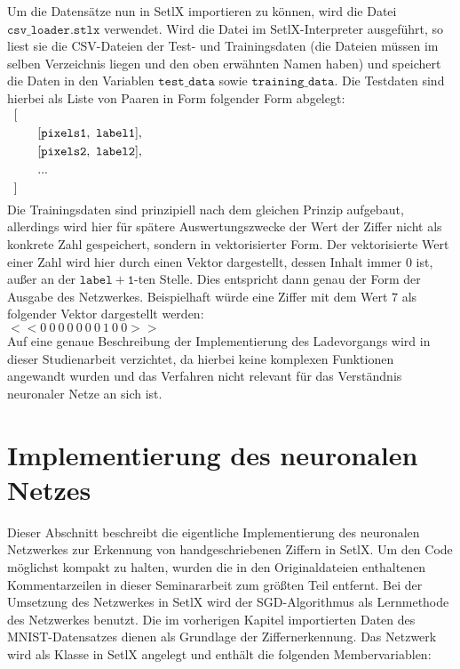 Um die Datensätze nun in SetlX importieren zu können, wird die Datei $\mathtt{csv\_loader.stlx}$ verwendet. Wird die Datei im SetlX-Interpreter ausgeführt, so liest sie die CSV-Dateien der Test- und Trainingsdaten (die Dateien müssen im selben Verzeichnis liegen und den oben erwähnten Namen haben) und speichert die Daten in den Variablen $\mathtt{test\_data}$ sowie $\mathtt{training\_data}$. Die Testdaten sind hierbei als Liste von Paaren in Form folgender Form abgelegt: \\
\hspace*{0.3cm}
$
\begin{array}[t]{lcll}
	[ \\[0.1cm]
	
	\hspace*{0.5cm}
	\begin{array}[t]{lcll}
    	[\mathtt{pixels1},\ \mathtt{label1}], \\[0.1cm]
    	[\mathtt{pixels2},\ \mathtt{label2}], \\[0.1cm]
    	... \\[0.1cm]
    \end{array}
    \\[0.1cm]
    
    ] \\[0.1cm]
\end{array}
$
\\[0.0cm]

\noindent
Die Trainingsdaten sind prinzipiell nach dem gleichen Prinzip aufgebaut, allerdings wird hier für spätere Auswertungszwecke der Wert der Ziffer nicht als konkrete Zahl gespeichert, sondern in vektorisierter Form. Der vektorisierte Wert einer Zahl wird hier durch einen Vektor dargestellt, dessen Inhalt immer 0 ist, außer an der $\mathtt{label+1}$-ten Stelle. Dies entspricht dann genau der Form der Ausgabe des Netzwerkes. Beispielhaft würde eine Ziffer mit dem Wert $7$ als folgender Vektor dargestellt werden: \\
$<<0\ 0\ 0\ 0\ 0\ 0\ 0\ 1\ 0\ 0>>$ \\

\noindent
Auf eine genaue Beschreibung der Implementierung des Ladevorgangs wird in dieser Studienarbeit verzichtet, da hierbei keine komplexen Funktionen angewandt wurden und das Verfahren nicht relevant für das Verständnis neuronaler Netze an sich ist.

\section{Implementierung des neuronalen Netzes}
Dieser Abschnitt beschreibt die eigentliche Implementierung des neuronalen Netzwerkes zur Erkennung von handgeschriebenen Ziffern in SetlX. Um den Code möglichst kompakt zu halten, wurden die in den Originaldateien enthaltenen Kommentarzeilen in dieser Seminararbeit zum größten Teil entfernt.
Bei der Umsetzung des Netzwerkes in SetlX wird der SGD-Algorithmus als Lernmethode des Netzwerkes benutzt. Die im vorherigen Kapitel importierten Daten des MNIST-Datensatzes dienen als Grundlage der Ziffernerkennung. 
Das Netzwerk wird als Klasse in SetlX angelegt und enthält die folgenden Membervariablen:

